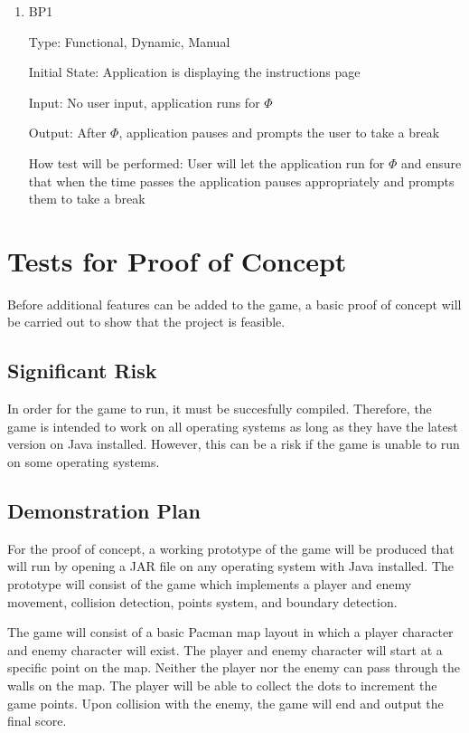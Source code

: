 \documentclass[12pt, titlepage]{article}
\begin{document}
\begin{enumerate}

\item{BP1\\}

Type: Functional, Dynamic, Manual
					
Initial State: Application is displaying the instructions page
					
Input: No user input, application runs for $\hyperref[tab:constants]{\Phi}$
					
Output: After $\hyperref[tab:constants]{\Phi}$, application pauses and prompts the user to take a break
					
How test will be performed: User will let the application run for $\hyperref[tab:constants]{\Phi}$ and ensure that when the time passes the application pauses appropriately and prompts them to take a break

\end{enumerate}

\section{Tests for Proof of Concept}

Before additional features can be added to the game, a basic proof of concept will be carried out to show that the project is feasible. 

\subsection{Significant Risk}

In order for the game to run, it must be succesfully compiled. Therefore, the game is intended to work on all operating systems as long as they have the latest version on Java installed. However, this can be a risk if the game is unable to run on some operating systems.

\subsection{Demonstration Plan}

For the proof of concept, a working prototype of the game will be produced that will run by opening a JAR file on any operating system with Java installed. The prototype will consist of the game which implements a player and enemy movement, collision detection, points system, and boundary detection.

	The game will consist of a basic Pacman map layout in which a player character and enemy character will exist. The player and enemy character will start at a specific point on the map. Neither the player nor the enemy can pass through the walls on the map. The player will be able to collect the dots to increment the game points. Upon collision with the enemy, the game will end and output the final score.
\end{document}
